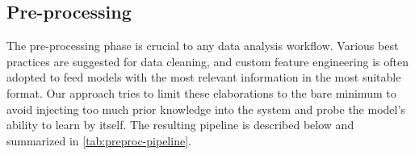 \subsection{Pre-processing}


The pre-processing phase is crucial to any data analysis workflow. Various best practices are suggested for data cleaning, and custom feature engineering is often adopted to feed models with the most relevant information in the most suitable format.
Our approach tries to limit these elaborations to the bare minimum to avoid injecting too much prior knowledge into the system and probe the model's ability to learn by itself.
The resulting pipeline is described below and summarized in \cref{tab:preproc-pipeline}.

